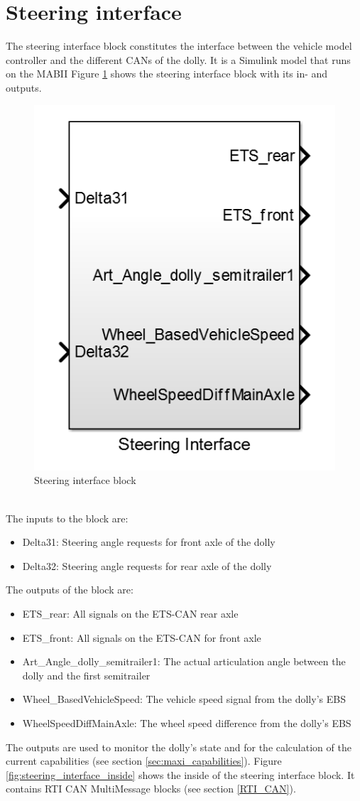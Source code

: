 \documentclass[ExampleMasters.tex]{subfiles}
\begin{document}
\section{Steering interface}
\label{sec:steering_interface}
The steering interface block constitutes the interface between the vehicle model controller and the different \gls{CAN}s of the dolly. It is a Simulink model that runs on the \gls{MABII}
Figure \ref{fig:steering_interface} shows the steering interface block with its in- and outputs. 
\begin{figure}[!htb]
	\centering
	\includegraphics[width=0.5\linewidth]{figures/steering_interface}
	
	\caption{Steering interface block}
	\label{fig:steering_interface}
\end{figure} \\
The inputs to the block are:
\begin{itemize}
	\item Delta31: Steering angle requests for front axle of the dolly 
	\item Delta32: Steering angle requests for rear axle of the dolly 
\end{itemize} 
 The outputs of the block are:
 \begin{itemize}
 	\item ETS\_rear: All signals on the \gls{ETS}-\gls{CAN} rear axle
 	\item ETS\_front: All signals on the \gls{ETS}-\gls{CAN} for front axle
 	\item Art\_Angle\_dolly\_semitrailer1: The actual articulation angle between the dolly and the first semitrailer
 	\item Wheel\_BasedVehicleSpeed: The vehicle speed signal from the dolly's \gls{EBS}
 	\item WheelSpeedDiffMainAxle: The wheel speed difference from the dolly's \gls{EBS}
 \end{itemize}
 The outputs are used to monitor the dolly's state and for the calculation of the current capabilities (see section \ref{sec:maxi_capabilities}).
 Figure \ref{fig:steering_interface_inside} shows the inside of the steering interface block. It contains \gls{RTI} \gls{CAN} MultiMessage blocks (see section \ref{RTI_CAN}).   
 
\end{document}
